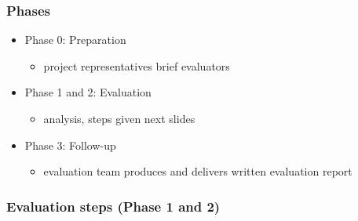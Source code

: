 \hypertarget{phases}{%
\subsubsection{Phases}\label{phases}}

\begin{itemize}
\tightlist
\item
  Phase 0: Preparation

  \begin{itemize}
  \tightlist
  \item
    project representatives brief evaluators
  \end{itemize}
\item
  Phase 1 and 2: Evaluation

  \begin{itemize}
  \tightlist
  \item
    analysis, steps given next slides
  \end{itemize}
\item
  Phase 3: Follow-up

  \begin{itemize}
  \tightlist
  \item
    evaluation team produces and delivers written evaluation report
  \end{itemize}
\end{itemize}

\hypertarget{evaluation-steps-phase-1-and-2}{%
\subsubsection{Evaluation steps (Phase 1 and
2)}\label{evaluation-steps-phase-1-and-2}}

